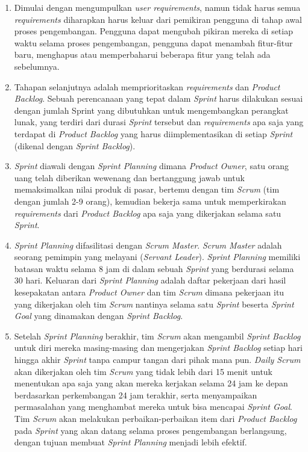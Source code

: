 \begin{enumerate}
\item Dimulai dengan mengumpulkan \textit{user requirements}, namun tidak harus semua \textit{requirements} diharapkan harus keluar dari pemikiran pengguna di tahap awal proses pengembangan. Pengguna dapat mengubah pikiran mereka di setiap waktu selama proses pengembangan, pengguna dapat menambah fitur-fitur baru, menghapus atau memperbaharui beberapa fitur yang telah ada sebelumnya.

\item Tahapan selanjutnya adalah memprioritaskan \textit{requirements} dan \textit{Product Backlog}. Sebuah perencanaan yang tepat dalam \textit{Sprint} harus dilakukan sesuai dengan jumlah Sprint yang dibutuhkan untuk mengembangkan perangkat lunak, yang terdiri dari durasi \textit{Sprint} tersebut dan \textit{requirements} apa saja yang terdapat di \textit{Product Backlog} yang harus diimplementasikan di setiap \textit{Sprint} (dikenal dengan \textit{Sprint Backlog}).

\item \textit{Sprint} diawali dengan \textit{Sprint Planning} dimana \textit{Product Owner}, satu orang uang telah diberikan wewenang dan bertanggung jawab untuk memaksimalkan nilai produk di pasar, bertemu dengan tim \textit{Scrum} (tim dengan jumlah 2-9 orang), kemudian bekerja sama untuk memperkirakan \textit{requirements} dari \textit{Product Backlog} apa saja yang dikerjakan selama satu \textit{Sprint}.

\item \textit{Sprint Planning} difasilitasi dengan \textit{Scrum Master}. \textit{Scrum Master} adalah seorang pemimpin yang melayani (\textit{Servant Leader}). \textit{Sprint Planning} memiliki batasan waktu selama 8 jam di dalam sebuah \textit{Sprint} yang berdurasi selama 30 hari. Keluaran dari \textit{Sprint Planning} adalah daftar pekerjaan dari hasil kesepakatan antara \textit{Product Owner} dan tim \textit{Scrum} dimana pekerjaan itu yang dikerjakan oleh tim \textit{Scrum} nantinya selama satu \textit{Sprint} beserta \textit{Sprint Goal} yang dinamakan dengan \textit{Sprint Backlog}.

\item Setelah \textit{Sprint Planning} berakhir, tim \textit{Scrum} akan mengambil \textit{Sprint Backlog} untuk diri mereka masing-masing dan mengerjakan \textit{Sprint Backlog} setiap hari hingga akhir \textit{Sprint} tanpa campur tangan dari pihak mana pun. \textit{Daily Scrum} akan dikerjakan oleh tim \textit{Scrum} yang tidak lebih dari 15 menit untuk menentukan apa saja yang akan mereka kerjakan selama 24 jam ke depan berdasarkan perkembangan 24 jam terakhir, serta menyampaikan permasalahan yang menghambat mereka untuk bisa mencapai \textit{Sprint Goal}. Tim \textit{Scrum} akan melakukan perbaikan-perbaikan item dari \textit{Product Backlog} pada \textit{Sprint} yang akan datang selama proses pengembangan berlangsung, dengan tujuan membuat \textit{Sprint Planning} menjadi lebih efektif.


\end{enumerate}
